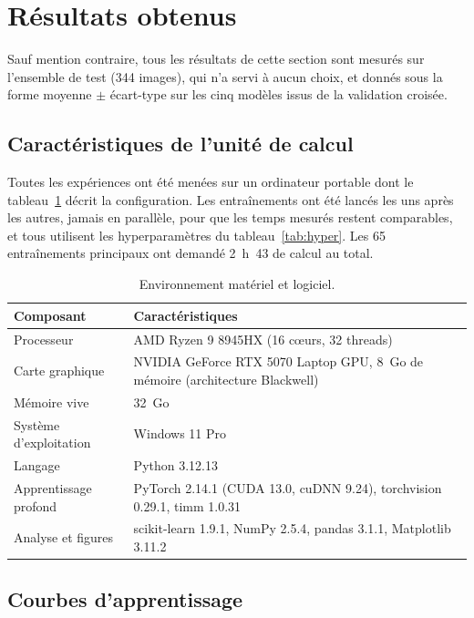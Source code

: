 \section{Résultats obtenus}
\label{sec:resultats}

Sauf mention contraire, tous les résultats de cette section sont mesurés sur l'ensemble de test (344 images), qui n'a servi à aucun choix, et donnés sous la forme moyenne $\pm$ écart-type sur les cinq modèles issus de la validation croisée.

\subsection{Caractéristiques de l'unité de calcul}
\label{sec:materiel}

Toutes les expériences ont été menées sur un ordinateur portable dont le tableau~\ref{tab:hardware} décrit la configuration. Les entraînements ont été lancés les uns après les autres, jamais en parallèle, pour que les temps mesurés restent comparables, et tous utilisent les hyperparamètres du tableau~\ref{tab:hyper}. Les 65 entraînements principaux ont demandé 2~h~43 de calcul au total.

\begin{table}[htbp]
\centering
\caption{Environnement matériel et logiciel.}
\label{tab:hardware}
\small
\begin{tabularx}{0.92\textwidth}{l X}
\toprule
\textbf{Composant} & \textbf{Caractéristiques} \\
\midrule
Processeur & AMD Ryzen 9 8945HX (16 cœurs, 32 threads) \\
Carte graphique & NVIDIA GeForce RTX 5070 Laptop GPU, 8~Go de mémoire (architecture Blackwell) \\
Mémoire vive & 32~Go \\
Système d'exploitation & Windows 11 Pro \\
Langage & Python 3.12.13 \\
Apprentissage profond & PyTorch 2.14.1 (CUDA 13.0, cuDNN 9.24), torchvision 0.29.1, timm 1.0.31 \\
Analyse et figures & scikit-learn 1.9.1, NumPy 2.5.4, pandas 3.1.1, Matplotlib 3.11.2 \\
\bottomrule
\end{tabularx}
\end{table}

\subsection{Courbes d'apprentissage}
\label{sec:courbes}

